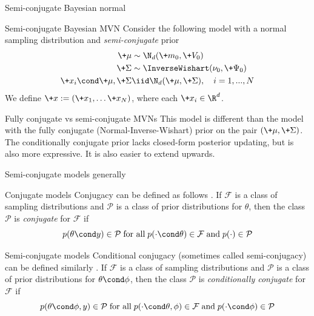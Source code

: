 \documentclass[10pt]{beamer}
\begin{document}
\begin{frame}{Semi-conjugate Bayesian normal}

\begin{sblock}{Semi-conjugate Bayesian MVN}
Consider the following model with a normal sampling distribution and \textit{semi-conjugate} prior 
\begin{align*}
\+\mu &\sim \N_{d}(\+m_0,\+V_0 ) \\
\+\Sigma &\sim \InverseWishart(\nu_0,  \+\Psi_0) \\
\+x_i \cond \+\mu,  \+\Sigma &\iid \N_{d}( \+\mu , \+\Sigma), \quad i=1,...,N
\end{align*}
We define $\+x := (\+x_1,  \hdots \+x_N)$,  where each $\+x_i \in \R^d$.
\end{sblock}
\pause 

\vfill
\begin{sblock}{Fully conjugate vs semi-conjugate MVNs}
This model is different than the model with the fully conjugate (Normal-Inverse-Wishart) prior on the pair $(\+\mu, \+\Sigma)$.   The conditionally conjugate prior lacks closed-form posterior updating,  but is also more expressive.    It is also easier to extend upwards.
\end{sblock}

\end{frame}

\begin{frame}{Semi-conjugate models generally}

\begin{sblock}{Conjugate models}
Conjugacy can be defined as follows \cite{gelman2013bayesian}. If $\mathcal{F}$ is a class of sampling distributions and $\mathcal{P}$ is a class of prior distributions for $\theta$, then the class $\mathcal{P}$ is \textit{conjugate} for $\mathcal{F}$ if
\[  p(\theta \cond y ) \in \mathcal{P} \; \text{for all} \; p(\cdot \cond \theta) \in \mathcal{F} \; \text{and} \; p(\cdot) \in \mathcal{P} \]
\end{sblock}

\begin{sblock}{Semi-conjugate models}
Conditional conjugacy (sometimes called semi-conjugacy) can be defined similarly  \cite{gelman2013bayesian}.  If $\mathcal{F}$ is a class of sampling distributions and $\mathcal{P}$ is a class of prior distributions for $\theta \cond \phi$, then the class $\mathcal{P}$ is \textit{conditionally conjugate} for $\mathcal{F}$ if
\[  p(\theta \cond \phi, y) \in \mathcal{P} \; \text{for all} \; p(\cdot \cond \theta, \phi) \in \mathcal{F} \; \text{and} \; p(\cdot \cond \phi) \in \mathcal{P} \]
\end{sblock}
\pause 
{}
\end{frame}
\end{document}
